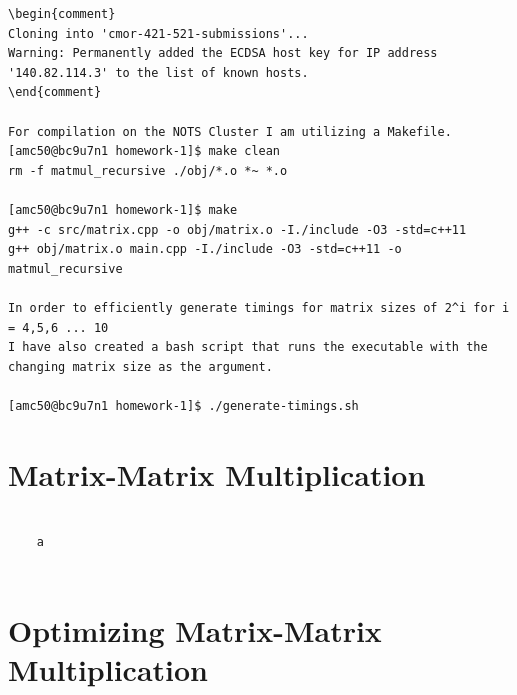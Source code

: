 \documentclass{article}
\begin{document}
\begin{verbatim}
\begin{comment}
Cloning into 'cmor-421-521-submissions'...
Warning: Permanently added the ECDSA host key for IP address '140.82.114.3' to the list of known hosts.
\end{comment}

For compilation on the NOTS Cluster I am utilizing a Makefile.
[amc50@bc9u7n1 homework-1]$ make clean
rm -f matmul_recursive ./obj/*.o *~ *.o

[amc50@bc9u7n1 homework-1]$ make
g++ -c src/matrix.cpp -o obj/matrix.o -I./include -O3 -std=c++11
g++ obj/matrix.o main.cpp -I./include -O3 -std=c++11 -o matmul_recursive

In order to efficiently generate timings for matrix sizes of 2^i for i = 4,5,6 ... 10
I have also created a bash script that runs the executable with the changing matrix size as the argument. 

[amc50@bc9u7n1 homework-1]$ ./generate-timings.sh 

\end{verbatim}

\section{Matrix-Matrix Multiplication}
\begin{verbatim}

    a
    
\end{verbatim}

\section{Optimizing Matrix-Matrix Multiplication}
\begin{verbatim}
\end{verbatim}
\end{document}
